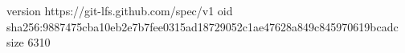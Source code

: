 version https://git-lfs.github.com/spec/v1
oid sha256:9887475cba10eb2e7b7fee0315ad18729052c1ae47628a849c845970619bcadc
size 6310
